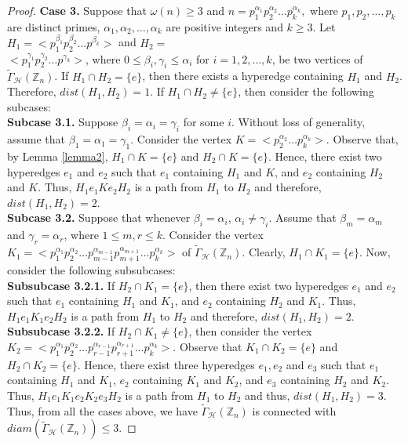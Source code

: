 \documentclass[11pt,a4paper]{article}
\theoremstyle{definition}
\theoremstyle{remark}
\begin{document}
\begin{proof}
				\noindent\textbf{Case 3.} Suppose that  $\omega(n) \geq 3$ and  $n=p_1^{\alpha_1} p_2^{\alpha_2} \ldots p_k^{\alpha_k},$ where $p_1,p_2, \ldots, p_k$ are distinct primes, $\alpha_1, \alpha_2, \ldots, \alpha_k$ are positive integers and $k\geq 3$. Let $H_1=<p_1^{\beta_1} p_2^{\beta_2} \ldots p^{\beta_k}>$ and  $H_2=$ \\ $<p_1^{\gamma_1} p_2^{\gamma_2} \ldots p^{\gamma_k}>$, where $0 \leq \beta_i,\gamma_i \leq \alpha_i$ for $i=1,2, \ldots, k$, be two vertices of 	$\tilde{\Gamma}_\mathcal{H}(\mathbb{Z}_n)$. If $H_1 \cap H_2 =\{e\}$, then there exists a hyperedge containing $H_1$ and $H_2$. Therefore, $dist(H_1,H_2)=1.$ If $H_1 \cap H_2 \neq \{e\}$, then consider the following subcases: \\ 
				\textbf{Subcase 3.1.} Suppose $\beta_i=\alpha_i=\gamma_i$ for some $i$. Without loss of generality, assume that $\beta_1=\alpha_1=\gamma_1$. Consider the vertex $K=<p_2^{\alpha_2} \ldots p_k^{\alpha_k}>$. Observe that, by Lemma \ref{lemma2}, $H_1 \cap K =\{e\}$ and $H_2 \cap K =\{e\}$. Hence, there exist two hyperedges $e_1$ and $e_2$ such that $e_1$ containing $H_1$ and $K$, and $e_2$ containing $H_2$ and $K$. Thus, $H_1 e_1 K e_2 H_2$ is a path from $H_1$ to $H_2$ and therefore, $dist(H_1,H_2)=2$.\\
				\textbf{Subcase 3.2.} Suppose that whenever  $\beta_i = \alpha_i$, $\alpha_i \neq \gamma_i$. Assume that $\beta_m =\alpha_m$ and $\gamma_r =\alpha_r$, where $1 \leq m,r \leq k$. Consider the vertex  $K_1=<p_1^{\alpha_1}p_2^{\alpha_2}\ldots p_{m-1}^{\alpha_{m-1}} p_{m+1}^{\alpha_{m+1}} \ldots p_k^{\alpha_k}>$ of $\tilde{\Gamma}_\mathcal{H}(\mathbb{Z}_n)$. Clearly, $H_1 \cap K_1 =\{e\}$. Now, consider the following subsubcases:\\
				\textbf{Subsubcase 3.2.1.} If $H_2 \cap K_1=\{e\}$, then  there exist two hyperedges $e_1$ and $e_2$ such that $e_1$ containing $H_1$ and $K_1$, and $e_2$ containing $H_2$ and $K_1$. Thus, $H_1 e_1 K_1 e_2 H_2$ is a path from $H_1$ to $H_2$ and therefore, $dist(H_1,H_2)=2$.\\
				\textbf{Subsubcase 3.2.2.} If  $H_2 \cap K_1 \neq \{e\}$, then consider the vertex $K_2=<p_1^{\alpha_1}p_2^{\alpha_2}\ldots p_{r-1}^{\alpha_{r-1}} p_{r+1}^{\alpha_{r+1}} \ldots p_k^{\alpha_k}>$.  Observe that $K_1 \cap K_2 =\{e\}$ and $H_2 \cap K_2 =\{e\}$. Hence, there exist three hyperedges $e_1,e_2$ and $e_3$ such that $e_1$ containing $H_1$ and $K_1$, $e_2$ containing $K_1$ and $K_2$, and $e_3$ containing $H_2$ and $K_2$. Thus, $H_1 e_1 K_1 e_2 K_2 e_3 H_2$ is a path from $H_1$ to $H_2$ and thus, $dist(H_1,H_2)=3$.\\
				Thus, from all the cases above, we have $\tilde{\Gamma}_\mathcal{H}(\mathbb{Z}_n)$ is connected with $diam(\tilde{\Gamma}_\mathcal{H}(\mathbb{Z}_n)) \leq 3$.
			\end{proof}
			
\end{document}
